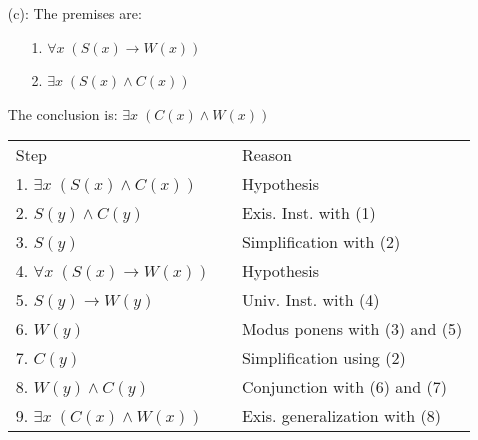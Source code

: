 \begin{questions}
\begin{solution}
\begin{itemize}[itemsep=0pt,parsep=0pt,topsep=0pt,partopsep=0pt]

    \item[(c):] The premises are: 
    \begin{itemize}[itemsep=0pt,parsep=0pt,topsep=0pt,partopsep=0pt]
      \item[1.] $\forall x\; (S(x) \rightarrow W(x))$
      \item[2.] $\exists x\; (S(x) \wedge C(x))$
    \end{itemize} 
    The conclusion is: $\exists x\; (C(x) \wedge W(x))$
    
    \smallskip
    \begin{tabular}{lll}
        Step        & \hspace{0.2in} & Reason \\
        1. $\exists x\; (S(x) \wedge C(x))$  &   & Hypothesis \\
        2. $S(y) \wedge C(y)$               &   & Exis. Inst. with (1) \\
        3. $S(y)$                           &   & Simplification with (2) \\
        4. $\forall x\; (S(x) \rightarrow W(x))$ &  & Hypothesis \\
        5. $S(y) \rightarrow W(y)$          & & Univ. Inst. with (4) \\
        6. $W(y)$                           & & Modus ponens with (3) and (5) \\
        7. $C(y)$                           & & Simplification using (2) \\
        8. $W(y) \wedge C(y)$               & & Conjunction with (6) and (7) \\
        9. $\exists x\; (C(x) \wedge W(x))$ &   & Exis. generalization with (8) \\
    \end{tabular}
    \end{itemize}
  \end{solution}





\end{questions}

